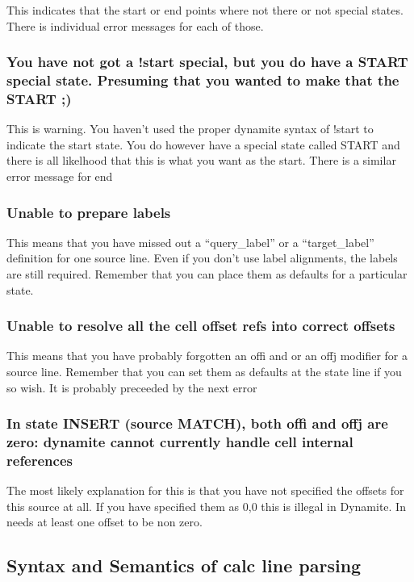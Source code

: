 This indicates that the start or end points where not there or not special states.
There is individual error messages for each of those.

\subsubsection{You have not got a !start special, but you do have a START special
state. Presuming that you wanted to make that the START ;)}

This is warning. You haven't used the proper dynamite syntax of !start to indicate the
start state. You do however have a special state called START and there is all likelhood
that this is what you want as the start. There is a similar error message for end

\subsubsection{Unable to prepare labels}

This means that you have missed out a ``query\_label'' or a ``target\_label'' definition
for one source line. Even if you don't use label alignments, the labels are still required.
Remember that you can place them as defaults for a particular state.


\subsubsection{Unable to resolve all the cell offset refs into correct offsets}

This means that you have probably forgotten an offi and or an offj modifier for
a source line. Remember that you can set them as defaults at the state line if
you so wish. It is probably preceeded by the next error

\subsubsection{In state INSERT (source MATCH), both offi and offj are zero: dynamite
cannot currently handle cell internal references}

The most likely explanation for this is that you have not specified the offsets for
this source at all. If you have specified them as 0,0 this is illegal in Dynamite. In
needs at least one offset to be non zero.

\subsection{Syntax and Semantics of calc line parsing}

